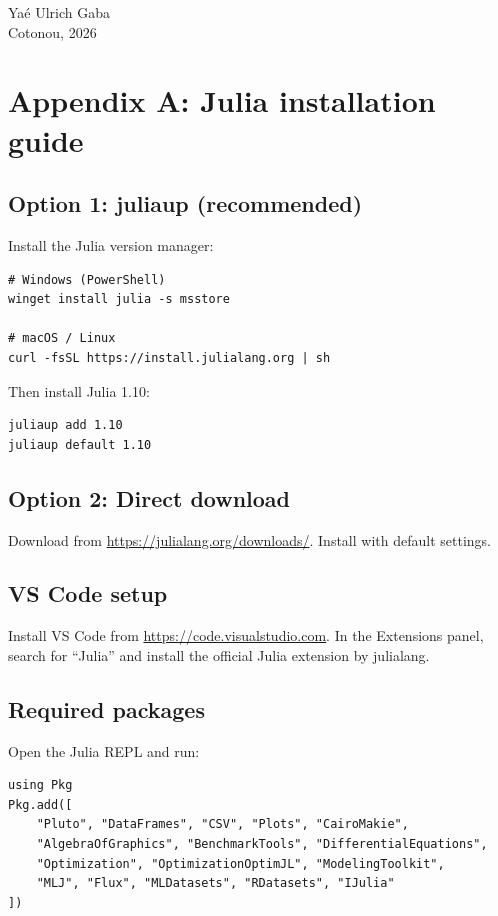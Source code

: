\documentclass[12pt,a4paper,twoside]{book}
\begin{document}
\vfill
\noindent Yaé Ulrich Gaba\\
Cotonou, 2026

\mainmatter












\backmatter

\chapter*{Appendix A: Julia installation guide}

\section*{Option 1: juliaup (recommended)}
Install the Julia version manager:
\begin{verbatim}
# Windows (PowerShell)
winget install julia -s msstore

# macOS / Linux
curl -fsSL https://install.julialang.org | sh
\end{verbatim}

Then install Julia 1.10:
\begin{verbatim}
juliaup add 1.10
juliaup default 1.10
\end{verbatim}

\section*{Option 2: Direct download}
Download from \url{https://julialang.org/downloads/}. Install with default settings.

\section*{VS Code setup}
Install VS Code from \url{https://code.visualstudio.com}. In the Extensions panel, search for ``Julia'' and install the official Julia extension by julialang.

\section*{Required packages}
Open the Julia REPL and run:
\begin{verbatim}
using Pkg
Pkg.add([
    "Pluto", "DataFrames", "CSV", "Plots", "CairoMakie",
    "AlgebraOfGraphics", "BenchmarkTools", "DifferentialEquations",
    "Optimization", "OptimizationOptimJL", "ModelingToolkit",
    "MLJ", "Flux", "MLDatasets", "RDatasets", "IJulia"
])
\end{verbatim}
\end{document}
